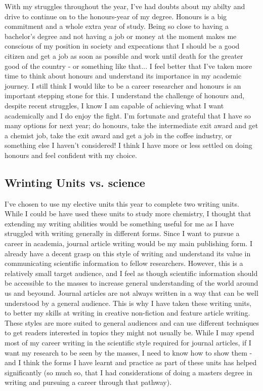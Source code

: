\documentclass[11pt]{article}
\begin{document}
With my struggles throughout the year, I've had doubts about my abilty and drive to continue on to the honours-year of my degree. Honours is a big commitment and a whole extra year of study. Being so close to having a bachelor's degree and not having a job or money at the moment makes me conscious of my position in society and expecations that I should be a good citizen and get a job as soon as possible and work until death for the greater good of the country - or something like that... I feel better that I've taken more time to think about honours and understand its importance in my academic journey. I still think I would like to be a career researcher and honours is an important stepping stone for this. I understand the challenge of honours and, despite recent struggles, I know I am capable of achieving what I want academically and I do enjoy the fight. I'm fortunate and grateful that I have so many options for next year; do honours, take the intermediate exit award and get a chemist job, take the exit award and get a job in the coffee industry, or something else I haven't considered! I think I have more or less settled on doing honours and feel confident with my choice.

\subsection{Wrinting Units vs. science}

I've chosen to use my elective units this year to complete two writing units. While I could be have used these units to study more chemistry, I thought that extending my writing abilities would be something useful for me as I have struggled with writing generally in different forms. Since I want to pursue a career in academia, journal article writing would be my main publishing form. I already have a decent grasp on this style of writing and understand its value in communicating scientific information to fellow researchers. However, this is a relatively small target audience, and I feel as though scientific information should be accessible to the masses to increase general understanding of the world around us and beyound. Journal articles are not always written in a way that can be well understood by a general audience. This is why I have taken these writing units, to better my skills at writing in creative non-fiction and feature article writing. These styles are more suited to general audiences and can use different techniques to get readers interested in topics they might not usually be. While I may spend most of my career writing in the scientific style required for journal articles, if I want my research to be seen by the masses, I need to know how to show them - and I think the forms I have learnt and practice as part of these units has helped significantly (so much so, that I had considerations of doing a masters degree in writing and pursuing a career through that pathway).
\end{document}
